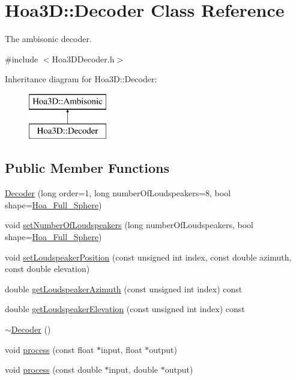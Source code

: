 \hypertarget{class_hoa3_d_1_1_decoder}{\section{Hoa3\-D\-:\-:Decoder Class Reference}
\label{class_hoa3_d_1_1_decoder}
}


The ambisonic decoder.  




{\ttfamily \#include $<$Hoa3\-D\-Decoder.\-h$>$}

Inheritance diagram for Hoa3\-D\-:\-:Decoder\-:\begin{figure}[H]
\begin{center}
\leavevmode
\includegraphics[height=2.000000cm]{class_hoa3_d_1_1_decoder}
\end{center}
\end{figure}
\subsection*{Public Member Functions}
\begin{DoxyCompactItemize}
\item 
\hyperlink{class_hoa3_d_1_1_decoder_a0900afc94e0ae855feaf009b97ec9e75}{Decoder} (long order=1, long number\-Of\-Loudspeakers=8, bool shape=\hyperlink{namespace_hoa3_d_a96e1558dd670aa7cddab38a58aa10c49aeb2d6c7f779a838421f9999a46a2ca22}{Hoa\-\_\-\-Full\-\_\-\-Sphere})
\item 
void \hyperlink{class_hoa3_d_1_1_decoder_a4a5e94dc4bb0f1d9989659be522a0e8b}{set\-Number\-Of\-Loudspeakers} (long number\-Of\-Loudspeakers, bool shape=\hyperlink{namespace_hoa3_d_a96e1558dd670aa7cddab38a58aa10c49aeb2d6c7f779a838421f9999a46a2ca22}{Hoa\-\_\-\-Full\-\_\-\-Sphere})
\item 
void \hyperlink{class_hoa3_d_1_1_decoder_a18cc28c0db47350ece9ad51473ef62a0}{set\-Loudspeaker\-Position} (const unsigned int index, const double azimuth, const double elevation)
\item 
double \hyperlink{class_hoa3_d_1_1_decoder_aa30367ecd70695bd0d5bc60a730785a2}{get\-Loudspeaker\-Azimuth} (const unsigned int index) const 
\item 
double \hyperlink{class_hoa3_d_1_1_decoder_aa8afd37b12fca98cb9bda753be49effb}{get\-Loudspeaker\-Elevation} (const unsigned int index) const 
\item 
\hyperlink{class_hoa3_d_1_1_decoder_acc197bebb310a82756ee2061fe371e2d}{$\sim$\-Decoder} ()
\item 
void \hyperlink{class_hoa3_d_1_1_decoder_a146f985ebda8e825db2a2ed2cafd5ba6}{process} (const float $\ast$input, float $\ast$output)
\item 
void \hyperlink{class_hoa3_d_1_1_decoder_a2a1931b2fe5c5def0baa9c4d637379a9}{process} (const double $\ast$input, double $\ast$output)
\end{DoxyCompactItemize}


